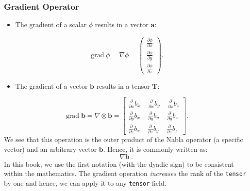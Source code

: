 \subsubsection{Gradient Operator}
%
%
\begin{itemize}
    \item The gradient of a scalar $\phi$ results in a vector $\textbf{a}$:
\end{itemize}
%
%
\begin{equation}
 \operatorname{grad}\phi = \nabla \phi
=
  \left(
  \begin{matrix}
    \frac{\partial \phi}{\partial x} \\
    \frac{\partial \phi}{\partial y} \\
    \frac{\partial \phi}{\partial z}
  \end{matrix}
  \right) .
  \label{EQUATION::gradientScalar}
\end{equation}
%
%
\begin{itemize}
    \item The gradient of a vector $\textbf{b}$ results in a tensor $\textbf{T}$:
\end{itemize}
%
%
\begin{equation}
 \operatorname{grad}\textbf{b} = \nabla \otimes \textbf{b}
=
  \left[
  \begin{matrix}
   \frac{\partial}{\partial x}b_x ~ ~ ~ ~ ~ \frac{\partial}{\partial x} b_y ~ ~ ~ ~ ~ \frac{\partial}{\partial x} b_z \\
   \frac{\partial}{\partial y}b_x ~ ~ ~ ~ ~ \frac{\partial}{\partial y} b_y ~ ~ ~ ~ ~ \frac{\partial}{\partial y} b_z \\
   \frac{\partial}{\partial z}b_x ~ ~ ~ ~ ~ \frac{\partial}{\partial z} b_y ~ ~ ~ ~ ~ \frac{\partial}{\partial z} b_z
  \end{matrix}
  \right] .
   \label{EQUATION::gradientVector}
\end{equation}
%
%
	We see that this operation is the outer product of the Nabla operator
    (a specific vector) and an arbitrary vector $\textbf{b}$. Hence, it is
    commonly written as:
%
%
\begin{equation}
  \nabla \textbf{b} ~.
\end{equation}
%
%
    In this book, we use the first notation (with the dyadic sign) to be
    consistent within the mathematics. The gradient operation \textit{increases}
    the rank of the \texttt{tensor} by one and hence, we can apply it to any
    \texttt{tensor} field.
%
%
%
%
